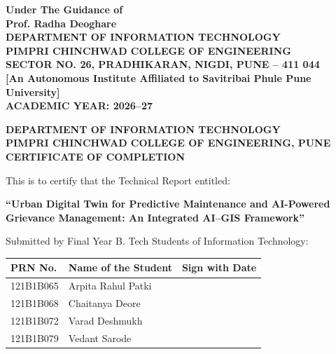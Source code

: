 \documentclass[12pt,a4paper]{report}
\begin{document}
\begin{titlepage}
\begin{center}
    \vspace{0.4cm}
    {\fontsize{12pt}{15pt}\selectfont \textbf{Under The Guidance of}}\\[0.2cm]
    {\fontsize{13pt}{16pt}\selectfont \textbf{Prof. Radha Deoghare}}\\[1.0cm]

    {\fontsize{13pt}{16pt}\selectfont \textbf{DEPARTMENT OF INFORMATION TECHNOLOGY}}\\[0.2cm]
    {\fontsize{13pt}{16pt}\selectfont \textbf{PIMPRI CHINCHWAD COLLEGE OF ENGINEERING}}\\[0.15cm]
    {\fontsize{11pt}{14pt}\selectfont \textbf{SECTOR NO. 26, PRADHIKARAN, NIGDI, PUNE -- 411 044}}\\[0.15cm]
    {\fontsize{10.5pt}{13pt}\selectfont \textbf{[An Autonomous Institute Affiliated to Savitribai Phule Pune University]}}\\[0.3cm]
    {\fontsize{12pt}{15pt}\selectfont \textbf{ACADEMIC YEAR: 2026--27}}
\end{center}
\end{titlepage}

\newpage
\thispagestyle{empty}
\begin{center}
    {\fontsize{14pt}{18pt}\selectfont \textbf{DEPARTMENT OF INFORMATION TECHNOLOGY}}\\[0.15cm]
    {\fontsize{13pt}{16pt}\selectfont \textbf{PIMPRI CHINCHWAD COLLEGE OF ENGINEERING, PUNE}}\\[0.6cm]
    {\fontsize{16pt}{20pt}\selectfont \textbf{CERTIFICATE OF COMPLETION}}\\[0.6cm]
\end{center}

\noindent This is to certify that the Technical Report entitled:
\begin{center}
    {\fontsize{12pt}{16pt}\selectfont \textbf{``Urban Digital Twin for Predictive Maintenance and AI-Powered Grievance Management: An Integrated AI--GIS Framework''}}
\end{center}
\noindent Submitted by Final Year B. Tech Students of Information Technology:

\begin{table}[h]
\centering
\fontsize{11pt}{14pt}\selectfont
\begin{tabular}{|p{3.2cm}|p{6.5cm}|p{4.2cm}|}
\hline
\textbf{PRN No.} & \textbf{Name of the Student} & \textbf{Sign with Date} \\
\hline
121B1B065 & Arpita Rahul Patki & \\
\hline
121B1B068 & Chaitanya Deore & \\
\hline
121B1B072 & Varad Deshmukh & \\
\hline
121B1B079 & Vedant Sarode & \\
\hline
\end{tabular}
\end{table}
\end{document}
